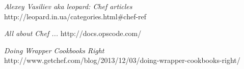 \begin{thebibliography}{9}

  \emph{Alexey Vasiliev aka leopard: Chef articles}
  http://leopard.in.ua/categories.html\#chef-ref

  \emph{All about Chef ...}
  http://docs.opscode.com/

  \emph{Doing Wrapper Cookbooks Right}
  http://www.getchef.com/blog/2013/12/03/doing-wrapper-cookbooks-right/

\end{thebibliography}